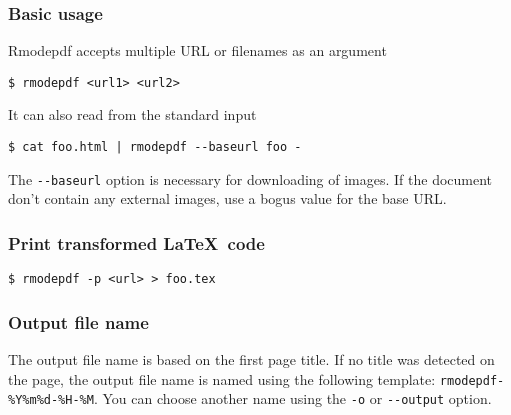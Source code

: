 \begin{frame}[fragile]
  \frametitle{Basic usage}

  Rmodepdf accepts multiple URL or filenames as an argument

\begin{verbatim}
$ rmodepdf <url1> <url2>
\end{verbatim}

It can also read from the standard input

\begin{verbatim}
$ cat foo.html | rmodepdf --baseurl foo - 
\end{verbatim}

The \verb|--baseurl| option is necessary for downloading of images. If the document don't contain any external images, 
use a bogus value for the base URL.
\end{frame}


\begin{frame}[fragile]
  \frametitle{Print transformed \LaTeX\ code}
\begin{verbatim}
$ rmodepdf -p <url> > foo.tex
\end{verbatim}
\end{frame}


\begin{frame}[fragile]
  \frametitle{Output file name}

\end{frame}

The output file name is based on the first page title. If no title was detected on the page, the output file name 
is named using the following template: \verb|rmodepdf-%Y%m%d-%H-%M|. You can choose another name using 
the \verb|-o| or \verb|--output| option.






